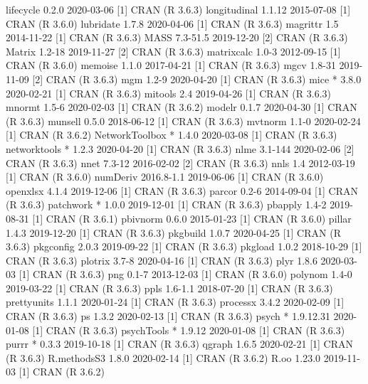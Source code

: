 \documentclass[a4paper,12pt]{article} %
\begin{document}
\begin{Schunk}
\begin{Soutput}
 lifecycle        0.2.0      2020-03-06 [1] CRAN (R 3.6.3)
 longitudinal     1.1.12     2015-07-08 [1] CRAN (R 3.6.0)
 lubridate        1.7.8      2020-04-06 [1] CRAN (R 3.6.3)
 magrittr         1.5        2014-11-22 [1] CRAN (R 3.6.3)
 MASS             7.3-51.5   2019-12-20 [2] CRAN (R 3.6.3)
 Matrix           1.2-18     2019-11-27 [2] CRAN (R 3.6.3)
 matrixcalc       1.0-3      2012-09-15 [1] CRAN (R 3.6.0)
 memoise          1.1.0      2017-04-21 [1] CRAN (R 3.6.3)
 mgcv             1.8-31     2019-11-09 [2] CRAN (R 3.6.3)
 mgm              1.2-9      2020-04-20 [1] CRAN (R 3.6.3)
 mice           * 3.8.0      2020-02-21 [1] CRAN (R 3.6.3)
 mitools          2.4        2019-04-26 [1] CRAN (R 3.6.3)
 mnormt           1.5-6      2020-02-03 [1] CRAN (R 3.6.2)
 modelr           0.1.7      2020-04-30 [1] CRAN (R 3.6.3)
 munsell          0.5.0      2018-06-12 [1] CRAN (R 3.6.3)
 mvtnorm          1.1-0      2020-02-24 [1] CRAN (R 3.6.2)
 NetworkToolbox * 1.4.0      2020-03-08 [1] CRAN (R 3.6.3)
 networktools   * 1.2.3      2020-04-20 [1] CRAN (R 3.6.3)
 nlme             3.1-144    2020-02-06 [2] CRAN (R 3.6.3)
 nnet             7.3-12     2016-02-02 [2] CRAN (R 3.6.3)
 nnls             1.4        2012-03-19 [1] CRAN (R 3.6.0)
 numDeriv         2016.8-1.1 2019-06-06 [1] CRAN (R 3.6.0)
 openxlsx         4.1.4      2019-12-06 [1] CRAN (R 3.6.3)
 parcor           0.2-6      2014-09-04 [1] CRAN (R 3.6.3)
 patchwork      * 1.0.0      2019-12-01 [1] CRAN (R 3.6.3)
 pbapply          1.4-2      2019-08-31 [1] CRAN (R 3.6.1)
 pbivnorm         0.6.0      2015-01-23 [1] CRAN (R 3.6.0)
 pillar           1.4.3      2019-12-20 [1] CRAN (R 3.6.3)
 pkgbuild         1.0.7      2020-04-25 [1] CRAN (R 3.6.3)
 pkgconfig        2.0.3      2019-09-22 [1] CRAN (R 3.6.3)
 pkgload          1.0.2      2018-10-29 [1] CRAN (R 3.6.3)
 plotrix          3.7-8      2020-04-16 [1] CRAN (R 3.6.3)
 plyr             1.8.6      2020-03-03 [1] CRAN (R 3.6.3)
 png              0.1-7      2013-12-03 [1] CRAN (R 3.6.0)
 polynom          1.4-0      2019-03-22 [1] CRAN (R 3.6.3)
 ppls             1.6-1.1    2018-07-20 [1] CRAN (R 3.6.3)
 prettyunits      1.1.1      2020-01-24 [1] CRAN (R 3.6.3)
 processx         3.4.2      2020-02-09 [1] CRAN (R 3.6.3)
 ps               1.3.2      2020-02-13 [1] CRAN (R 3.6.3)
 psych          * 1.9.12.31  2020-01-08 [1] CRAN (R 3.6.3)
 psychTools     * 1.9.12     2020-01-08 [1] CRAN (R 3.6.3)
 purrr          * 0.3.3      2019-10-18 [1] CRAN (R 3.6.3)
 qgraph           1.6.5      2020-02-21 [1] CRAN (R 3.6.3)
 R.methodsS3      1.8.0      2020-02-14 [1] CRAN (R 3.6.2)
 R.oo             1.23.0     2019-11-03 [1] CRAN (R 3.6.2)

\end{Soutput}
\end{Schunk}
\end{document}
